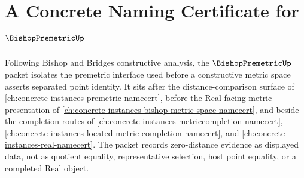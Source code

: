 \chapter{A Concrete Naming Certificate for $\BishopPremetricUp$}
\label{ch:concrete-instances-bishop-premetric-namecert}

Following Bishop and Bridges constructive analysis, the $\BishopPremetricUp$ packet isolates the premetric interface used before a constructive metric space asserts separated point identity. It sits after the distance-comparison surface of \autoref{ch:concrete-instances-premetric-namecert}, before the Real-facing metric presentation of \autoref{ch:concrete-instances-bishop-metric-space-namecert}, and beside the completion routes of \autoref{ch:concrete-instances-metriccompletion-namecert}, \autoref{ch:concrete-instances-located-metric-completion-namecert}, and \autoref{ch:concrete-instances-real-namecert}. The packet records zero-distance evidence as displayed data, not as quotient equality, representative selection, host point equality, or a completed Real object.

